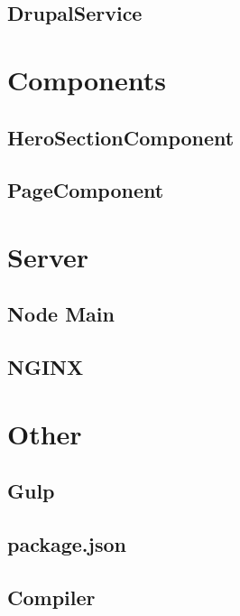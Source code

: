 \documentclass[11pt,a4paper]{article}
\begin{document}
\subsection{DrupalService}

\section{Components}
\subsection{HeroSectionComponent}

\subsection{PageComponent}

\section{Server}
\subsection{Node Main}

\subsection{NGINX}

\section{Other}
\subsection{Gulp}

\subsection{package.json}

\subsection{Compiler}

\end{document}
